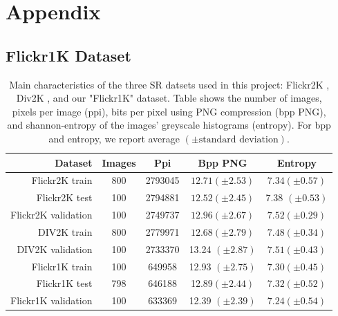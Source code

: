 \documentclass[10pt]{article} %
\begin{document}



\appendix
\section{Appendix}

\subsection{Flickr1K Dataset}


\begin{table}[ht]
    \centering
    \caption{Main characteristics of the three SR datsets used in this project: Flickr2K \citep{lim2017enhanced}, Div2K \citep{Agustsson_2017_CVPR_Workshops}, and our "Flickr1K" dataset. Table shows the number of images, pixels per image (ppi), bits per pixel using PNG compression (bpp PNG), and shannon-entropy of the images' greyscale histograms (entropy). For bpp and entropy, we report average $(\pm \textrm{standard deviation})$.}
    \begin{tabular}{r c c c c}\toprule
         Dataset & Images & Ppi & Bpp PNG & Entropy \\
         \midrule
        Flickr2K train & 800 & 2793045 & $12.71 (\pm 2.53)$ & $7.34 (\pm 0.57)$ \\ 
        Flickr2K test & 100 & 2794881 & $12.52 (\pm 2.45)$ & 7.38 $(\pm 0.53)$ \\ 
        Flickr2K validation & 100 & 2749737 & $12.96 (\pm 2.67)$ & $7.52 (\pm 0.29)$ \\ 
        DIV2K train & 800 & 2779971 & $12.68 (\pm 2.79)$ & $7.48 (\pm 0.34)$ \\ 
        DIV2K validation & 100 & 2733370 & 13.24 $(\pm 2.87)$ & $7.51 (\pm 0.43)$ \\ 
        Flickr1K train & 100 & 649958 & 12.93 $(\pm 2.75)$ & $7.30 (\pm 0.45)$ \\ 
        Flickr1K test & 798 & 646188 & 12.89$(\pm 2.44)$ & $7.32 (\pm 0.52)$ \\ 
        Flickr1K validation & 100 & 633369 & 12.39 $(\pm 2.39)$ & $7.24 (\pm 0.54)$ \\ 
        \bottomrule
    \end{tabular}

    \label{tab:image_dataest_characteristics}
\end{table}
\end{document}
